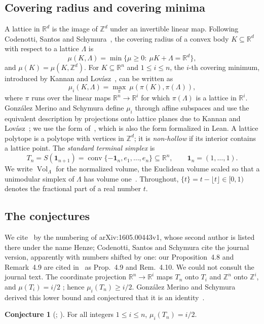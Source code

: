\documentclass[11pt]{article}
\theoremstyle{definition}
\newtheorem{conjecture}{Conjecture}
\theoremstyle{remark}
\newcommand{\R}{\mathbb R}
\newcommand{\Z}{\mathbb Z}
\newcommand{\one}{\mathbf 1}
\newcommand{\conv}{\operatorname{conv}}
\newcommand{\Vol}{\operatorname{Vol}}
\newcommand{\fr}[1]{\{#1\}}
\begin{document}
\subsection{Covering radius and covering minima}
A lattice in $\R^d$ is the image of $\Z^d$ under an invertible linear map.
Following Codenotti, Santos and Schymura~\cite{css}, the covering radius of a
convex body $K\subseteq\R^d$ with respect to a lattice $\Lambda$ is
\[
\mu(K,\Lambda)=\min\{\mu\ge0:\ \mu K+\Lambda=\R^d\},
\]
and $\mu(K)=\mu(K,\Z^d)$. For $K\subseteq\R^n$ and $1\le i\le n$, the $i$-th
covering minimum, introduced by Kannan and Lovász~\cite{kl}, can be written
as~\cite[p.~3]{css}
\[
\mu_i(K,\Lambda)=\max_\pi\ \mu(\pi(K),\pi(\Lambda)),
\]
where $\pi$ runs over the linear maps $\R^n\to\R^i$ for which $\pi(\Lambda)$ is
a lattice in $\R^i$. González Merino and Schymura define $\mu_i$ through affine
subspaces and use the equivalent description by projections onto lattice
planes due to Kannan and Lovász~\cite[eq.~(14)]{gms}; we use the form
of~\cite{css}, which is also the form formalized in Lean. A lattice polytope
is a polytope with vertices in $\Z^d$; it is \emph{non-hollow} if its interior
contains a lattice point. The \emph{standard terminal simplex} is
\[
T_n=S(\one_{n+1})=\conv\{-\one_n,e_1,\dots,e_n\}\subseteq\R^n ,
\qquad \one_n=(1,\dots,1).
\]
We write $\Vol_\Lambda$ for the normalized volume, the Euclidean volume scaled
so that a unimodular simplex of $\Lambda$ has volume one~\cite[p.~3]{css}.
Throughout, $\fr t=t-\lfloor t\rfloor\in[0,1)$ denotes the fractional part of
a real number $t$.

\subsection{The conjectures}
We cite~\cite{gms} by the numbering of arXiv:1605.00443v1, whose second
author is listed there under the name Henze; Codenotti, Santos and Schymura
cite the journal version, apparently with numbers shifted by one: our
Proposition~4.8 and Remark~4.9 are cited in~\cite{css} as Prop.~4.9 and
Rem.~4.10. We could not consult the journal text. The coordinate projection $\R^n\to\R^i$ maps
$T_n$ onto $T_i$ and $\Z^n$ onto $\Z^i$, and $\mu(T_i)=i/2$
\cite[Prop.~4.8]{gms}; hence $\mu_i(T_n)\ge i/2$. González Merino and
Schymura derived this lower bound and conjectured that it is an
identity~\cite[Remark~4.9]{gms}.

\setcounter{conjecture}{1}
\begin{conjecture}[{\cite[Remark~4.9]{gms}; \cite[Conjecture~B]{css}}]\label{conj:B}
For all integers $1\le i\le n$, $\mu_i(T_n)=i/2$.
\end{conjecture}
\end{document}
